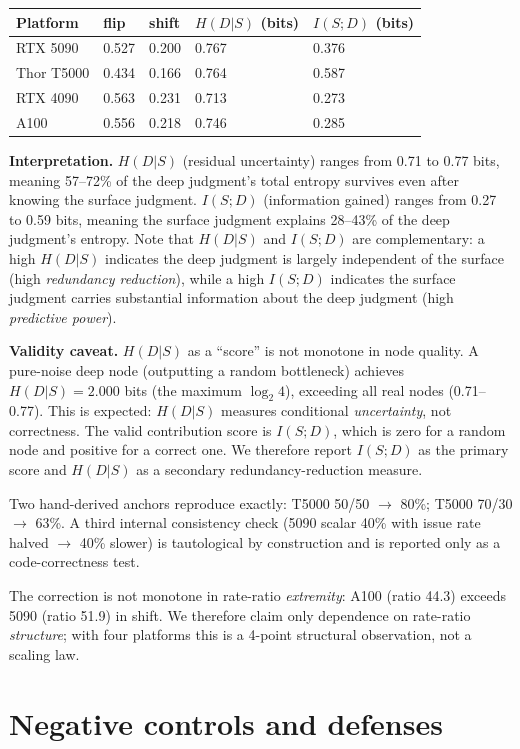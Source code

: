\documentclass[10pt]{article}
\begin{document}
\begin{longtable}[]{@{}lllll@{}}
\toprule\noalign{}
Platform & flip & shift & $H(D|S)$ (bits) & $I(S;D)$ (bits) \\
\midrule\noalign{}
\endhead
\bottomrule\noalign{}
\endlastfoot
RTX 5090 & 0.527 & 0.200 & 0.767 & 0.376 \\
Thor T5000 & 0.434 & 0.166 & 0.764 & 0.587 \\
RTX 4090 & 0.563 & 0.231 & 0.713 & 0.273 \\
A100 & 0.556 & 0.218 & 0.746 & 0.285 \\
\end{longtable}

\textbf{Interpretation.} $H(D|S)$ (residual uncertainty) ranges from 0.71 to 0.77 bits, meaning 57--72\% of the deep judgment's total entropy survives even after knowing the surface judgment. $I(S;D)$ (information gained) ranges from 0.27 to 0.59 bits, meaning the surface judgment explains 28--43\% of the deep judgment's entropy. Note that $H(D|S)$ and $I(S;D)$ are complementary: a high $H(D|S)$ indicates the deep judgment is largely independent of the surface (high \emph{redundancy reduction}), while a high $I(S;D)$ indicates the surface judgment carries substantial information about the deep judgment (high \emph{predictive power}).

\textbf{Validity caveat.} $H(D|S)$ as a ``score'' is not monotone in node quality. A pure-noise deep node (outputting a random bottleneck) achieves $H(D|S)=2.000$ bits (the maximum $\log_2 4$), exceeding all real nodes (0.71--0.77). This is expected: $H(D|S)$ measures conditional \emph{uncertainty}, not correctness. The valid contribution score is $I(S;D)$, which is zero for a random node and positive for a correct one. We therefore report $I(S;D)$ as the primary score and $H(D|S)$ as a secondary redundancy-reduction measure.

Two hand-derived anchors reproduce exactly: T5000 50/50 $\rightarrow$ 80\%; T5000 70/30 $\rightarrow$ 63\%. A third internal consistency check (5090 scalar 40\% with issue rate halved $\rightarrow$ 40\% slower) is tautological by construction and is reported only as a code-correctness test.

The correction is not monotone in rate-ratio \emph{extremity}: A100 (ratio 44.3) exceeds 5090 (ratio 51.9) in shift. We therefore claim only dependence on rate-ratio \emph{structure}; with four platforms this is a 4-point structural observation, not a scaling law.

\section{Negative controls and defenses}\label{negative-controls-and-defenses}
\end{document}
